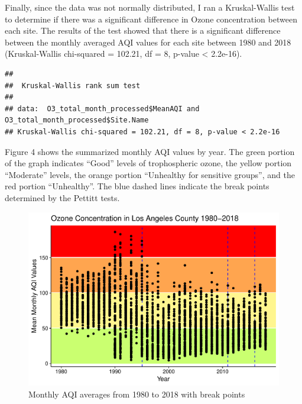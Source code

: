 \documentclass[12pt,]{article}
\newenvironment{Shaded}{\begin{snugshade}}{\end{snugshade}}
\newcommand{\KeywordTok}[1]{\textcolor[rgb]{0.13,0.29,0.53}{\textbf{#1}}}
\newcommand{\StringTok}[1]{\textcolor[rgb]{0.31,0.60,0.02}{#1}}
\newcommand{\OperatorTok}[1]{\textcolor[rgb]{0.81,0.36,0.00}{\textbf{#1}}}
\newcommand{\NormalTok}[1]{#1}
\begin{document}
Finally, since the data was not normally distributed, I ran a
Kruskal-Wallis test to determine if there was a significant difference
in Ozone concentration between each site. The results of the test showed
that there is a significant difference between the monthly averaged AQI
values for each site between 1980 and 2018 (Kruskal-Wallis chi-squared =
102.21, df = 8, p-value \textless{} 2.2e-16).

\begin{Shaded}
\end{Shaded}

\begin{verbatim}
## 
##  Kruskal-Wallis rank sum test
## 
## data:  O3_total_month_processed$MeanAQI and O3_total_month_processed$Site.Name
## Kruskal-Wallis chi-squared = 102.21, df = 8, p-value < 2.2e-16
\end{verbatim}

Figure 4 shows the summarized monthly AQI values by year. The green
portion of the graph indicates ``Good'' levels of trophospheric ozone,
the yellow portion ``Moderate'' levels, the orange portion ``Unhealthy
for sensitive groups'', and the red portion ``Unhealthy''. The blue
dashed lines indicate the break points determined by the Pettitt tests.

\begin{figure}
\centering
\includegraphics{Roth_ENV872_Project_files/figure-latex/plot data with break points-1.pdf}
\caption{Monthly AQI averages from 1980 to 2018 with break points}
\end{figure}
\end{document}
